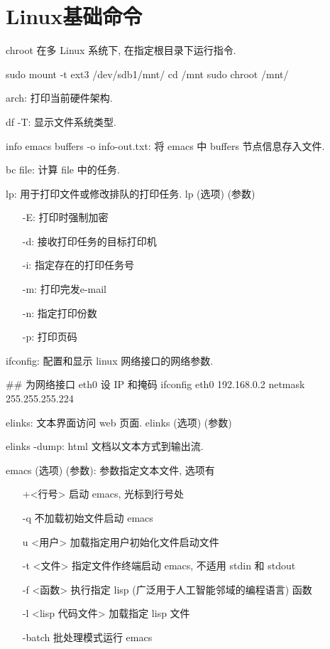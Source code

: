 \chapter{Linux基础命令}

chroot 在多 Linux 系统下, 在指定根目录下运行指令.
\begin{shell}
sudo mount -t ext3 /dev/sdb1/mnt/
cd /mnt
sudo chroot /mnt/
\end{shell}

arch: 打印当前硬件架构.

df -T: 显示文件系统类型.

info emacs buffers -o info-out.txt: 将 emacs 中 buffers 节点信息存入文件.

bc file: 计算 file 中的任务.

lp: 用于打印文件或修改排队的打印任务. lp (选项) (参数)
\begin{itemize}
 \item[-E:] 打印时强制加密
 \item[-d:] 接收打印任务的目标打印机
 \item[-i:] 指定存在的打印任务号
 \item[-m:] 打印完发e-mail
 \item[-n:] 指定打印份数
 \item[-p:] 打印页码
\end{itemize}

ifconfig: 配置和显示 linux 网络接口的网络参数.
\begin{shell}
## 为网络接口 eth0 设 IP 和掩码
ifconfig eth0 192.168.0.2 netmask 255.255.255.224
\end{shell}

elinks: 文本界面访问 web 页面. elinks (选项) (参数)
\begin{shell}
elinks -dump: html 文档以文本方式到输出流.
\end{shell}

emacs (选项) (参数): 参数指定文本文件, 选项有
\begin{itemize}
 \item[+<行号>] 启动 emacs, 光标到行号处
 \item[-q] 不加载初始文件启动 emacs
 \item[u <用户>] 加载指定用户初始化文件启动文件
 \item[-t <文件>] 指定文件作终端启动 emacs, 不适用 stdin 和 stdout
 \item[-f <函数>] 执行指定 lisp (广泛用于人工智能邻域的编程语言) 函数
 \item[-l <lisp 代码文件>] 加载指定 lisp 文件
 \item[-batch] 批处理模式运行 emacs
\end{itemize}

